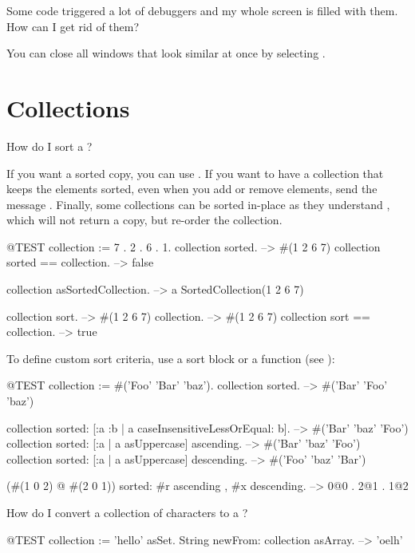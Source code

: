 \documentclass[a4paper,10pt,twoside]{book}
\begin{document}
\begin{faq}
Some code triggered a lot of debuggers and my whole screen is filled with them. 
How can I get rid of them?
\end{faq}
\answer
You can close all windows that look similar at once by selecting .

\section{Collections}

\begin{faq}
How do I sort a ?
\end{faq}
\answer
If you want a sorted copy, you can use . 
If you want to have a collection that keeps the elements sorted, even when you add or remove elements, send the message .
Finally, some collections can be sorted in-place as they understand , which will not return a copy, but re-order the collection.

\begin{code}{@TEST}
collection := {7 . 2 . 6 . 1}.
collection sorted. --> #(1 2 6 7)
collection sorted == collection. --> false

collection asSortedCollection. --> a SortedCollection(1 2 6 7)

collection sort. --> #(1 2 6 7)
collection. --> #(1 2 6 7)
collection sort == collection. --> true
\end{code}

To define custom sort criteria, use a sort block or a function (see ):

\begin{code}{@TEST}
collection := #('Foo' 'Bar' 'baz').
collection sorted. --> #('Bar' 'Foo' 'baz')

collection sorted: [:a :b | a caseInsensitiveLessOrEqual: b]. --> #('Bar' 'baz' 'Foo')
collection sorted: [:a | a asUppercase] ascending. --> #('Bar' 'baz' 'Foo')
collection sorted: [:a | a asUppercase] descending. --> #('Foo' 'baz' 'Bar')

(#(1 0 2) @ #(2 0 1)) sorted: #r ascending , #x descending. --> {0@0 . 2@1 . 1@2}
\end{code}

\begin{faq}
How do I convert a collection of characters to a ?
\end{faq}
\answer
\begin{code}{@TEST}
collection := 'hello' asSet.
String newFrom: collection asArray. --> 'oelh'
\end{code}
\end{document}
